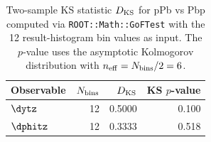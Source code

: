 \begin{table}[hbtp]
\centering
\begin{tabular}{|l|r|r|r|}
\hline
Observable & $N_{\rm bins}$ & $D_{\rm KS}$ & KS $p$-value \\
\hline
$\dytz$ & 12 & 0.5000 & 0.100 \\
$\dphitz$ & 12 & 0.3333 & 0.518 \\
\hline
\end{tabular}
\caption{Two-sample KS statistic $D_{\rm KS}$ for pPb vs Pbp computed via \texttt{ROOT::Math::GoFTest} with the 12 result-histogram bin values as input. The $p$-value uses the asymptotic Kolmogorov distribution with $n_{\rm eff} = N_{\rm bins}/2 = 6$.}
\label{table:combining_ks}
\end{table}
